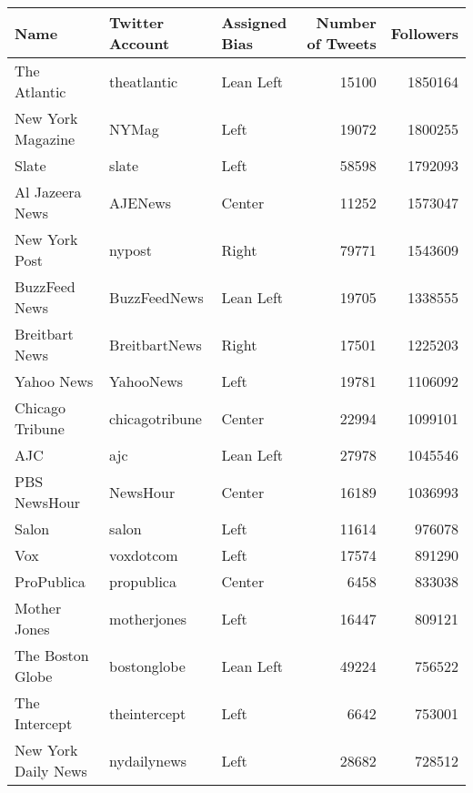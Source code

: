 \begin{tabular}{lllrr}
\toprule
                   Name & Twitter Account & Assigned Bias &  Number of Tweets &  Followers \\
\midrule
           The Atlantic &     theatlantic &     Lean Left &             15100 &    1850164 \\
      New York Magazine &           NYMag &          Left &             19072 &    1800255 \\
                  Slate &           slate &          Left &             58598 &    1792093 \\
        Al Jazeera News &         AJENews &        Center &             11252 &    1573047 \\
          New York Post &          nypost &         Right &             79771 &    1543609 \\
          BuzzFeed News &    BuzzFeedNews &     Lean Left &             19705 &    1338555 \\
         Breitbart News &   BreitbartNews &         Right &             17501 &    1225203 \\
             Yahoo News &       YahooNews &          Left &             19781 &    1106092 \\
        Chicago Tribune &  chicagotribune &        Center &             22994 &    1099101 \\
                    AJC &             ajc &     Lean Left &             27978 &    1045546 \\
           PBS NewsHour &        NewsHour &        Center &             16189 &    1036993 \\
                  Salon &           salon &          Left &             11614 &     976078 \\
                    Vox &       voxdotcom &          Left &             17574 &     891290 \\
             ProPublica &      propublica &        Center &              6458 &     833038 \\
           Mother Jones &     motherjones &          Left &             16447 &     809121 \\
       The Boston Globe &     bostonglobe &     Lean Left &             49224 &     756522 \\
          The Intercept &    theintercept &          Left &              6642 &     753001 \\
    New York Daily News &     nydailynews &          Left &             28682 &     728512 \\

\end{tabular}
